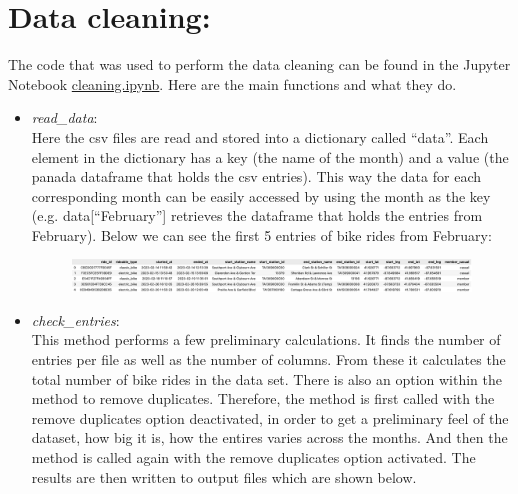 \documentclass[12pt]{article}
\begin{document}
\section*{Data cleaning:}
The code that was used to perform the data cleaning can be found in the Jupyter Notebook \href{https://github.com/SummerKassem/BikeShareCS/blob/main/Code/cleaning.ipynb}{cleaning.ipynb}. Here are the main functions and what they do.
\begin{itemize}
	\item \textit{read\_data}:\\
	Here the csv files are read and stored into a dictionary called “data”. Each element in the dictionary has a key (the name of the month) and a value (the panada dataframe that holds the csv entries). This way the data for each corresponding month can be easily accessed by using the month as the key (e.g. data[“February”] retrieves the dataframe that holds the entries from February). Below we can see the first 5 entries of bike rides from February:
	\begin{figure}[h]
	\hspace{-1.8cm}
	\includegraphics[width=8 in, height = 2 in]{img1.png}
	\end{figure}
	
	\item \textit{check\_entries}:\\
	This method performs a few preliminary calculations. It finds the number of entries per file as well as the number of columns. From these it calculates the total number of bike rides in the data set. There is also an option within the method to remove duplicates. Therefore, the method is first called with the remove duplicates option deactivated, in order to get a preliminary feel of the dataset, how big it is, how the entires varies across the months. And then the method is called again with the remove duplicates option activated. The results are then written to output files which are shown below. 
	

\end{itemize}
\end{document}
